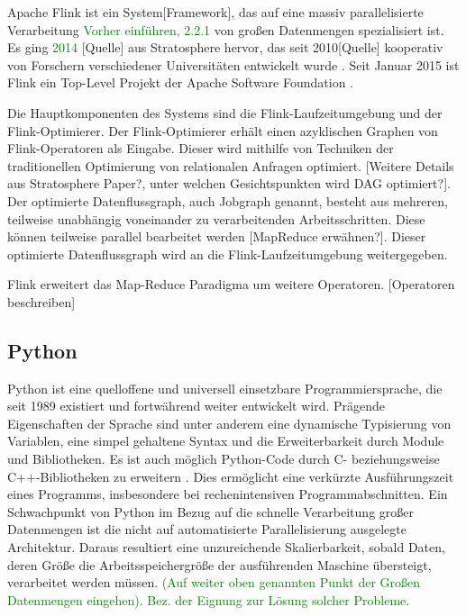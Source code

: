 Apache Flink ist ein System[Framework], das auf eine massiv parallelisierte Verarbeitung \textcolor{green}{Vorher einführen, 2.2.1} von großen Datenmengen spezialisiert ist. Es ging \textcolor{green}{2014} [Quelle] aus Stratosphere hervor, das seit 2010[Quelle] kooperativ von Forschern verschiedener Universitäten entwickelt wurde \cite{Alexandrov2014}. Seit Januar 2015 ist Flink ein Top-Level Projekt der Apache Software Foundation \cite{ApacheFlinkBlogEntry}. 

Die Hauptkomponenten des Systems sind die Flink-Laufzeitumgebung und der Flink-Optimierer. Der Flink-Optimierer erhält einen azyklischen Graphen von Flink-Operatoren als Eingabe. Dieser wird mithilfe von Techniken der traditionellen Optimierung von relationalen Anfragen optimiert. [Weitere Details aus Stratosphere Paper?, unter welchen Gesichtspunkten wird DAG optimiert?]. Der optimierte Datenflussgraph, auch Jobgraph genannt, besteht aus mehreren, teilweise unabhängig voneinander zu verarbeitenden Arbeitsschritten. Diese können teilweise parallel bearbeitet werden [MapReduce erwähnen?]. Dieser optimierte Datenflussgraph wird an die Flink-Laufzeitumgebung weitergegeben. 

Flink erweitert das Map-Reduce Paradigma um weitere Operatoren. [Operatoren beschreiben]
\subsection{Python}
Python ist eine quelloffene und universell einsetzbare Programmiersprache, die seit 1989 existiert und fortwährend weiter entwickelt wird. Prägende Eigenschaften der Sprache sind unter anderem eine dynamische Typisierung von Variablen, eine simpel gehaltene Syntax und die Erweiterbarkeit durch Module und Bibliotheken. Es ist auch möglich Python-Code durch C- beziehungsweise C++-Bibliotheken zu erweitern \cite{Martelli2006}. Dies ermöglicht eine verkürzte Ausführungszeit eines Programms, insbesondere bei rechenintensiven Programmabschnitten. Ein Schwachpunkt von Python im Bezug auf die schnelle Verarbeitung großer Datenmengen ist die nicht auf automatisierte Parallelisierung ausgelegte Architektur. Daraus resultiert eine unzureichende Skalierbarkeit, sobald Daten, deren Größe die Arbeitsspeichergröße der ausführenden Maschine übersteigt, verarbeitet werden müssen. \textcolor{green}{(Auf weiter oben genannten Punkt der Großen Datenmengen eingehen). Bez. der Eignung zur Lösung solcher Probleme}. 


